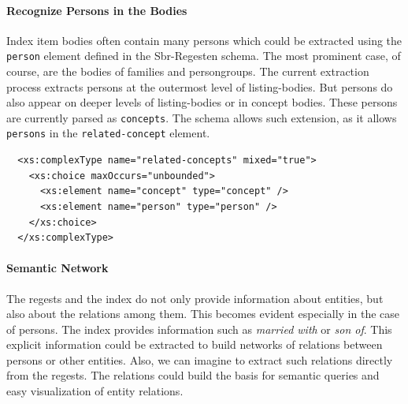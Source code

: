 \paragraph{Recognize Persons in the Bodies}
Index item bodies often contain many persons which could be extracted
using the \texttt{person} element defined in the Sbr-Regesten schema.
The most prominent case, of course, are the bodies of families and
persongroups. The current extraction process extracts persons at the
outermost level of listing-bodies. But persons do also appear on
deeper levels of listing-bodies or in concept bodies. These persons
are currently parsed as \texttt{concepts}. The schema allows such
extension, as it allows \texttt{persons} in the
\texttt{related-concept} element.

\begin{verbatim}
  <xs:complexType name="related-concepts" mixed="true">
    <xs:choice maxOccurs="unbounded">
      <xs:element name="concept" type="concept" />
      <xs:element name="person" type="person" />
    </xs:choice>
  </xs:complexType>
\end{verbatim}

\paragraph{Semantic Network}
The regests and the index do not only provide information about
entities, but also about the relations among them. This becomes
evident especially in the case of persons. The index provides
information such as \textit{married with} or \textit{son of}. This
explicit information could be extracted to build networks of relations
between persons or other entities. Also, we can imagine to extract
such relations directly from the regests. The relations could build
the basis for semantic queries and easy visualization of entity
relations.

